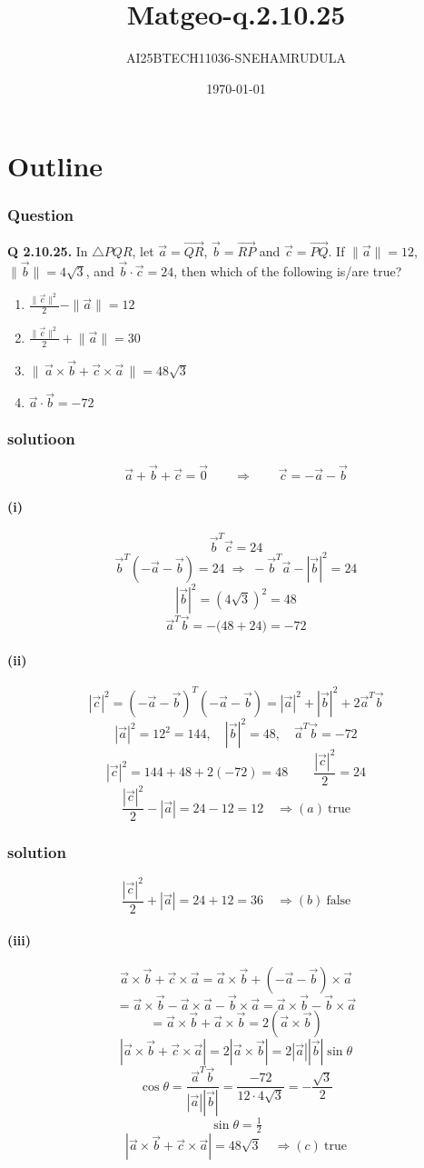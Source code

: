 \documentclass{beamer}
\title{Matgeo-q.2.10.25}
\author{AI25BTECH11036-SNEHAMRUDULA}
\date{\today}
\begin{document}
\begin{frame}
\titlepage
\end{frame}

\section*{Outline}
\begin{frame}
\frametitle{Question}
\textbf{Q 2.10.25.} In $\triangle PQR$, let $\vec a=\overrightarrow{QR}$, $\vec b=\overrightarrow{RP}$ and $\vec c=\overrightarrow{PQ}$. 
If $\lVert\vec a\rVert=12$, $\lVert\vec b\rVert=4\sqrt{3}$, and $\vec b\cdot\vec c=24$, then which of the following is/are true?
\begin{enumerate}
\item $\frac{\|\vec c\rVert^{2}}{2}-\|\vec a\|=12$
\item $\frac{\lVert\vec c\rVert^{2}}{2}+\lVert\vec a\rVert=30$
\item $\bigl\lVert\,\vec a\times\vec b+\vec c\times\vec a\,\bigr\rVert=48\sqrt{3}$
\item $\vec a\cdot\vec b=-72$
\end{enumerate}
\end{frame}
\begin{frame}
\frametitle{solutioon}
\[
\vec a+\vec b+\vec c=\vec0\qquad\Rightarrow\qquad \vec c=-\vec a-\vec b
\]

\paragraph{(i)}
\[
\vec b^{T}\vec c=24
\]
\[
\vec b^{T}(-\vec a-\vec b)=24\;\Rightarrow\; -\vec b^{T}\vec a-|\vec b|^{2}=24
\]
\[
|\vec b|^{2}=(4\sqrt3)^{2}=48
\]
\[
\vec a^{T}\vec b=-\big(48+24\big)=-72
\]

\paragraph{(ii)}
\[
|\vec c|^{2}=(-\vec a-\vec b)^{T}(-\vec a-\vec b)=|\vec a|^{2}+|\vec b|^{2}+2\vec a^{T}\vec b
\]
\[
|\vec a|^{2}=12^{2}=144,\quad |\vec b|^{2}=48,\quad \vec a^{T}\vec b=-72
\]
\[
|\vec c|^{2}=144+48+2(-72)=48\qquad\frac{|\vec c|^{2}}{2}=24
\]
\[
\frac{|\vec c|^{2}}{2}-|\vec a|=24-12=12\quad\Rightarrow (a)\ \text{true}
\]
\end{frame}
\frametitle{solution}
\[
\frac{|\vec c|^{2}}{2}+|\vec a|=24+12=36\quad\Rightarrow (b)\ \text{false}
\]

\paragraph{(iii)}
\[
\vec a\times\vec b+\vec c\times\vec a=\vec a\times\vec b+(-\vec a-\vec b)\times\vec a
\]
\[
=\vec a\times\vec b-\vec a\times\vec a-\vec b\times\vec a= \vec a\times\vec b-\vec b\times\vec a
\]
\[
=\vec a\times\vec b+\vec a\times\vec b=2(\vec a\times\vec b)
\]
\[
|\vec a\times\vec b+\vec c\times\vec a|=2|\vec a\times\vec b|=2|\vec a||\vec b|\sin\theta
\]
\[
\cos\theta=\dfrac{\vec a^{T}\vec b}{|\vec a||\vec b|}=\dfrac{-72}{12\cdot4\sqrt3}=-\dfrac{\sqrt3}{2}
\]
\[
\sin\theta=\tfrac12
\]
\[
|\vec a\times\vec b+\vec c\times\vec a|=48\sqrt3\quad\Rightarrow (c)\ \text{true}
\]
\end{document}
